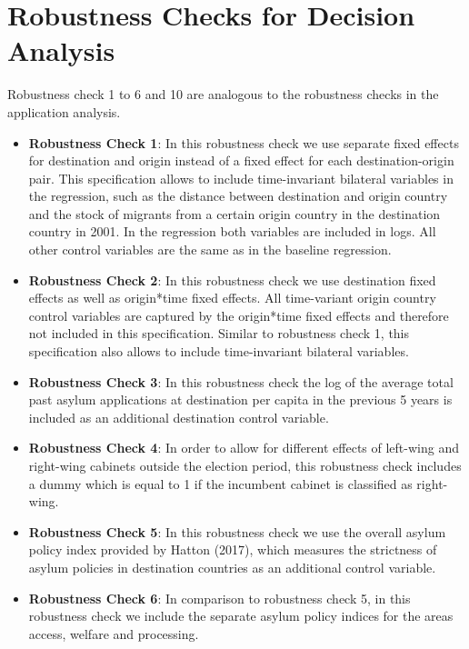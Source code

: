 \documentclass[11pt,a4paper]{scrartcl}
\begin{document}
\clearpage
\FloatBarrier
\section{Robustness Checks for Decision Analysis}
Robustness check 1 to 6 and 10 are analogous to the robustness checks in the application analysis.

\begin{itemize}
	\item \textbf{Robustness Check 1}: In this robustness check we use separate fixed effects for destination and origin instead of a fixed effect for each destination-origin pair. This specification allows to include time-invariant bilateral variables in the regression, such as the distance between destination and origin country and the stock of migrants from a certain origin country in the destination country in 2001. In the regression both variables are included in logs. All other control variables are the same as in the baseline regression.  
	
	\item \textbf{Robustness Check 2}: In this robustness check we use destination fixed effects as well as origin*time fixed effects. All time-variant origin country control variables are captured by the origin*time fixed effects and therefore not included in this specification. Similar to robustness check 1, this specification also allows to include time-invariant bilateral variables.  
	
	\item \textbf{Robustness Check 3}: In this robustness check the log of the average total past asylum applications at destination per capita in the previous 5 years is included as an additional destination control variable. 
	
	\item \textbf{Robustness Check 4}: In order to allow for different effects of left-wing and right-wing cabinets outside the election period, this robustness check includes a dummy which is equal to 1 if the incumbent cabinet is classified as right-wing.   
	
	\item \textbf{Robustness Check 5}: In this robustness check we use the overall asylum policy index provided by Hatton (2017), which measures the strictness of asylum policies in destination countries as an additional control variable.
	
	\item \textbf{Robustness Check 6}: In comparison to robustness check 5, in this robustness check we include the separate asylum policy indices for the areas access, welfare and processing. 
	

\end{itemize}
\end{document}
